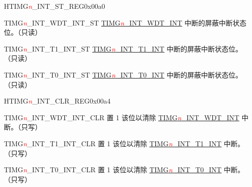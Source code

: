 \begin{register}{H}{TIMG\textcolor{red}{\it{n}}\_INT\_ST\_REG}{0x00a0}\label{regdesc:TIMERSINTSTREG}
%
%
%
%
\regnewline%
\begin{regdesc}\begin{reglist}
\item [TIMG\textcolor{red}{\it{n}}\_INT\_WDT\_INT\_ST] \hyperref[int:TIMERSINTWDTINT]{TIMG\textcolor{red}{\it{n}}\_INT\_WDT\_INT} 中断的屏蔽中断状态位。（只读）
\item [TIMG\textcolor{red}{\it{n}}\_INT\_T1\_INT\_ST] \hyperref[int:TIMERSINTT1INT]{TIMG\textcolor{red}{\it{n}}\_INT\_T1\_INT} 中断的屏蔽中断状态位。（只读）
\item [TIMG\textcolor{red}{\it{n}}\_INT\_T0\_INT\_ST] \hyperref[int:TIMERSINTT0INT]{TIMG\textcolor{red}{\it{n}}\_INT\_T0\_INT} 中断的屏蔽中断状态位。（只读）
\end{reglist}\end{regdesc}
\end{register}


\begin{register}{H}{TIMG\textcolor{red}{\it{n}}\_INT\_CLR\_REG}{0x00a4}\label{regdesc:TIMERSINTCLRREG}
%
%
%
%
\regnewline%
\begin{regdesc}\begin{reglist}
\item [TIMG\textcolor{red}{\it{n}}\_INT\_WDT\_INT\_CLR]置 1 该位以清除 \hyperref[int:TIMERSINTWDTINT]{TIMG\textcolor{red}{\it{n}}\_INT\_WDT\_INT} 中断。（只写）
\item [TIMG\textcolor{red}{\it{n}}\_INT\_T1\_INT\_CLR]置 1 该位以清除 \hyperref[int:TIMERSINTT1INT]{TIMG\textcolor{red}{\it{n}}\_INT\_T1\_INT} 中断。（只写）
\item [TIMG\textcolor{red}{\it{n}}\_INT\_T0\_INT\_CLR]置 1 该位以清除 \hyperref[int:TIMERSINTT0INT]{TIMG\textcolor{red}{\it{n}}\_INT\_T0\_INT} 中断。（只写）
\end{reglist}\end{regdesc}
\end{register}